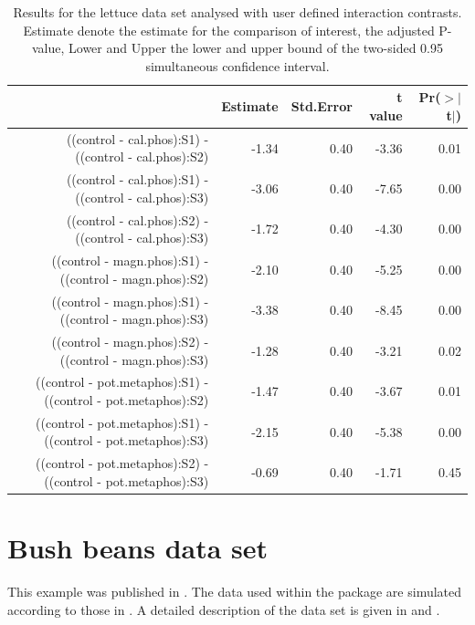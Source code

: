 \documentclass[12pt]{article}\usepackage[]{graphicx}\usepackage[]{color}
\begin{document}
\begin{table}[ht]
\centering
{\scriptsize
\begin{tabular}{rrrrr}
  \hline
 & Estimate & Std.Error & t value & Pr($>$$|$t$|$) \\ 
  \hline
((control - cal.phos):S1) - ((control - cal.phos):S2) & -1.34 & 0.40 & -3.36 & 0.01 \\ 
  ((control - cal.phos):S1) - ((control - cal.phos):S3) & -3.06 & 0.40 & -7.65 & 0.00 \\ 
  ((control - cal.phos):S2) - ((control - cal.phos):S3) & -1.72 & 0.40 & -4.30 & 0.00 \\ 
  ((control - magn.phos):S1) - ((control - magn.phos):S2) & -2.10 & 0.40 & -5.25 & 0.00 \\ 
  ((control - magn.phos):S1) - ((control - magn.phos):S3) & -3.38 & 0.40 & -8.45 & 0.00 \\ 
  ((control - magn.phos):S2) - ((control - magn.phos):S3) & -1.28 & 0.40 & -3.21 & 0.02 \\ 
  ((control - pot.metaphos):S1) - ((control - pot.metaphos):S2) & -1.47 & 0.40 & -3.67 & 0.01 \\ 
  ((control - pot.metaphos):S1) - ((control - pot.metaphos):S3) & -2.15 & 0.40 & -5.38 & 0.00 \\ 
  ((control - pot.metaphos):S2) - ((control - pot.metaphos):S3) & -0.69 & 0.40 & -1.71 & 0.45 \\ 
   \hline
\end{tabular}
}
\caption{Results for the lettuce data set analysed with user defined interaction contrasts. Estimate denote the estimate for the comparison of interest, the adjusted P-value, Lower and Upper the lower and upper bound of the two-sided 0.95 simultaneous confidence interval.} 
\end{table}







\newpage
\section{Bush beans data set}
This example was published in \citet[p. 154]{Petersen.1985}. The data used within the \verb@statint@ package are simulated according to those in \cite{Petersen.1985}. A detailed description of the data set is given in \cite{Petersen.1985} and \cite{Kitsche.2014}.
\end{document}
